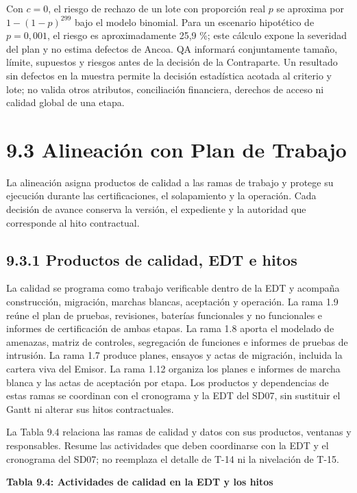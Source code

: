 \documentclass[11pt]{article}
\begin{document}
Con $c=0$, el riesgo de rechazo de un lote con proporción real $p$ se aproxima por $1-(1-p)^{299}$ bajo el modelo binomial. Para un escenario hipotético de $p=0{,}001$, el riesgo es aproximadamente 25,9 \%; este cálculo expone la severidad del plan y no estima defectos de Ancoa. QA informará conjuntamente tamaño, límite, supuestos y riesgos antes de la decisión de la Contraparte. Un resultado sin defectos en la muestra permite la decisión estadística acotada al criterio y lote; no valida otros atributos, conciliación financiera, derechos de acceso ni calidad global de una etapa.

\section{9.3 Alineación con Plan de Trabajo}

La alineación asigna productos de calidad a las ramas de trabajo y protege su ejecución durante las certificaciones, el solapamiento y la operación. Cada decisión de avance conserva la versión, el expediente y la autoridad que corresponde al hito contractual.

\subsection{9.3.1 Productos de calidad, EDT e hitos}

La calidad se programa como trabajo verificable dentro de la EDT y acompaña construcción, migración, marchas blancas, aceptación y operación. La rama 1.9 reúne el plan de pruebas, revisiones, baterías funcionales y no funcionales e informes de certificación de ambas etapas. La rama 1.8 aporta el modelado de amenazas, matriz de controles, segregación de funciones e informes de pruebas de intrusión. La rama 1.7 produce planes, ensayos y actas de migración, incluida la cartera viva del Emisor. La rama 1.12 organiza los planes e informes de marcha blanca y las actas de aceptación por etapa. Los productos y dependencias de estas ramas se coordinan con el cronograma y la EDT del SD07, sin sustituir el Gantt ni alterar sus hitos contractuales.

La Tabla 9.4 relaciona las ramas de calidad y datos con sus productos, ventanas y responsables. Resume las actividades que deben coordinarse con la EDT y el cronograma del SD07; no reemplaza el detalle de T-14 ni la nivelación de T-15.

\textbf{Tabla 9.4: Actividades de calidad en la EDT y los hitos}\label{tab:9-4}
\end{document}
